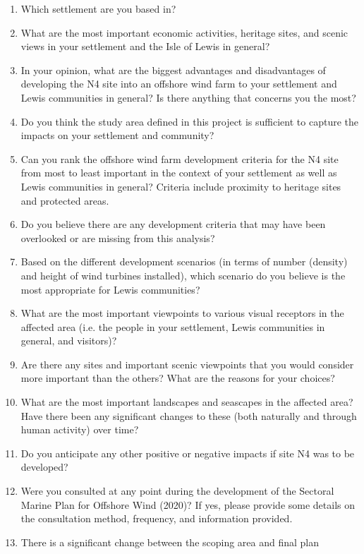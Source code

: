 \begin{enumerate}[noitemsep]
  \item Which settlement are you based in?
  \item What are the most important economic activities, heritage sites, and
  scenic views in your settlement and the Isle of Lewis in general?
  \item In your opinion, what are the biggest advantages and disadvantages of
  developing the N4 site into an offshore wind farm to your settlement and Lewis
  communities in general? Is there anything that concerns you the most?
  \item Do you think the study area defined in this project is sufficient to
  capture the impacts on your settlement and community?
  \item Can you rank the offshore wind farm development criteria for the N4
  site from most to least important in the context of your settlement as well as
  Lewis communities in general? Criteria include proximity to heritage sites and
  protected areas.
  \item Do you believe there are any development criteria that may have been
  overlooked or are missing from this analysis?
  \item Based on the different development scenarios (in terms of number
  (density) and height of wind turbines installed), which scenario do you believe
  is the most appropriate for Lewis communities?
  \item What are the most important viewpoints to various visual receptors in
  the affected area (i.e. the people in your settlement, Lewis communities in
  general, and visitors)?
  \item Are there any sites and important scenic viewpoints that you would
  consider more important than the others? What are the reasons for your choices?
  \item What are the most important landscapes and seascapes in the affected
  area? Have there been any significant changes to these (both naturally and
  through human activity) over time?
  \item Do you anticipate any other positive or negative impacts if site N4 was
  to be developed?
  \item Were you consulted at any point during the development of the Sectoral
  Marine Plan for Offshore Wind (2020)? If yes, please provide some details on
  the consultation method, frequency, and information provided.
  \item There is a significant change between the scoping area and final plan

\end{enumerate}
